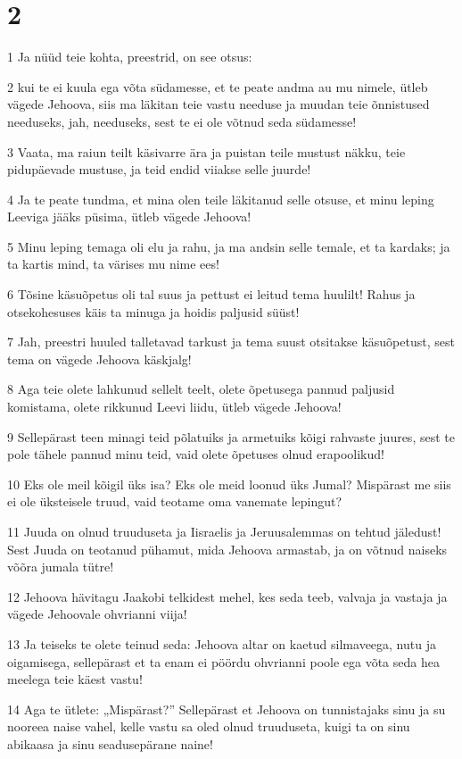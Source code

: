\chapter{2}

\par 1 Ja nüüd teie kohta, preestrid, on see otsus:
\par 2 kui te ei kuula ega võta südamesse, et te peate andma au mu nimele, ütleb vägede Jehoova, siis ma läkitan teie vastu needuse ja muudan teie õnnistused needuseks, jah, needuseks, sest te ei ole võtnud seda südamesse!
\par 3 Vaata, ma raiun teilt käsivarre ära ja puistan teile mustust näkku, teie pidupäevade mustuse, ja teid endid viiakse selle juurde!
\par 4 Ja te peate tundma, et mina olen teile läkitanud selle otsuse, et minu leping Leeviga jääks püsima, ütleb vägede Jehoova!
\par 5 Minu leping temaga oli elu ja rahu, ja ma andsin selle temale, et ta kardaks; ja ta kartis mind, ta värises mu nime ees!
\par 6 Tõsine käsuõpetus oli tal suus ja pettust ei leitud tema huulilt! Rahus ja otsekohesuses käis ta minuga ja hoidis paljusid süüst!
\par 7 Jah, preestri huuled talletavad tarkust ja tema suust otsitakse käsuõpetust, sest tema on vägede Jehoova käskjalg!
\par 8 Aga teie olete lahkunud sellelt teelt, olete õpetusega pannud paljusid komistama, olete rikkunud Leevi liidu, ütleb vägede Jehoova!
\par 9 Sellepärast teen minagi teid põlatuiks ja armetuiks kõigi rahvaste juures, sest te pole tähele pannud minu teid, vaid olete õpetuses olnud erapoolikud!
\par 10 Eks ole meil kõigil üks isa? Eks ole meid loonud üks Jumal? Mispärast me siis ei ole üksteisele truud, vaid teotame oma vanemate lepingut?
\par 11 Juuda on olnud truuduseta ja Iisraelis ja Jeruusalemmas on tehtud jäledust! Sest Juuda on teotanud pühamut, mida Jehoova armastab, ja on võtnud naiseks võõra jumala tütre!
\par 12 Jehoova hävitagu Jaakobi telkidest mehel, kes seda teeb, valvaja ja vastaja ja vägede Jehoovale ohvrianni viija!
\par 13 Ja teiseks te olete teinud seda: Jehoova altar on kaetud silmaveega, nutu ja oigamisega, sellepärast et ta enam ei pöördu ohvrianni poole ega võta seda hea meelega teie käest vastu!
\par 14 Aga te ütlete: „Mispärast?” Sellepärast et Jehoova on tunnistajaks sinu ja su nooreea naise vahel, kelle vastu sa oled olnud truuduseta, kuigi ta on sinu abikaasa ja sinu seadusepärane naine!
